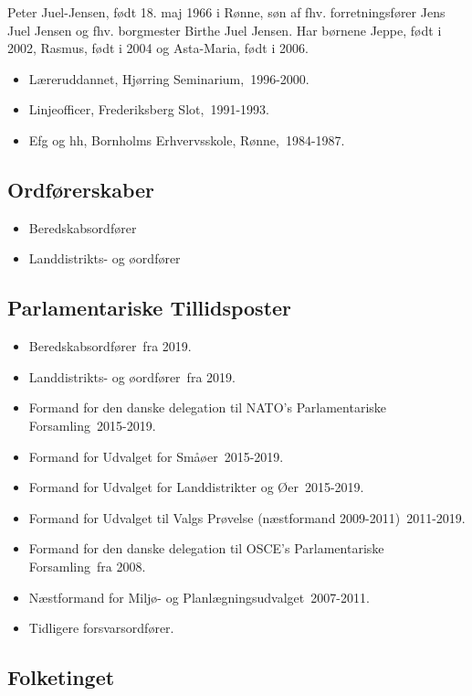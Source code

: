 \documentclass[11pt, a4paper]{awesome-cv}
\begin{document}
\makecvheader[R]
\makelettertitle
\begin{cvletter}
Peter Juel-Jensen, født 18. maj 1966 i Rønne, søn af fhv. forretningsfører Jens Juel Jensen og fhv. borgmester Birthe Juel Jensen. Har børnene Jeppe, født i 2002, Rasmus, født i 2004 og Asta-Maria, født i 2006.

\begin{itemize}
\item Læreruddannet, Hjørring Seminarium, 1996-2000.
\item Linjeofficer, Frederiksberg Slot, 1991-1993.
\item Efg og hh, Bornholms Erhvervsskole, Rønne, 1984-1987.
\end{itemize}
\subsection*{Ordførerskaber}
\begin{itemize}
\item Beredskabsordfører
\item Landdistrikts- og øordfører
\end{itemize}
\subsection*{Parlamentariske Tillidsposter}
\begin{itemize}
\item Beredskabsordfører fra 2019.
\item Landdistrikts- og øordfører fra 2019.
\item Formand for den danske delegation til NATO's Parlamentariske Forsamling 2015-2019.
\item Formand for Udvalget for Småøer 2015-2019.
\item Formand for Udvalget for Landdistrikter og Øer 2015-2019.
\item Formand for Udvalget til Valgs Prøvelse (næstformand 2009-2011) 2011-2019.
\item Formand for den danske delegation til OSCE's Parlamentariske Forsamling fra 2008.
\item Næstformand for Miljø- og Planlægningsudvalget 2007-2011.
\item Tidligere forsvarsordfører.
\end{itemize}
\subsection*{Folketinget}

\end{cvletter}
\end{document}
